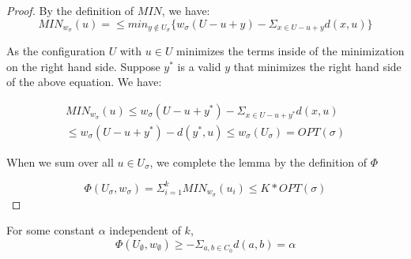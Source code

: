 \begin{proof}
     By the definition of $MIN$, we have:
     \begin{equation*}
        MIN_{w_\sigma}(u) = \leq min_{y \not \in U_\sigma} \{ w_\sigma(U - u + y) - \Sigma_{x \in U - u + y} d(x, u)\}
     \end{equation*}

     As the configuration $U$ with $u \in U$ minimizes the terms inside of the minimization on the right hand side. Suppose $y^*$ is a valid $y$ that minimizes the right hand side of the above equation. We have:
     
     \begin{equation*}
        \begin{gathered}
            MIN_{w_\sigma}(u) \leq w_\sigma(U - u + y^*) - \Sigma_{x \in U - u + y^*} d(x, u) \\
        \leq w_\sigma(U - u + y^*) - d(y^*, u) \leq w_\sigma(U_\sigma) = OPT(\sigma)
        \end{gathered}
     \end{equation*}

     When we sum over all $u \in U_\sigma$, we complete the lemma by the definition of $\Phi$
     
     \begin{equation*}
        \Phi(U_\sigma, w_\sigma) = \Sigma_{i=1}^k MIN_{w_\sigma}(u_i) \leq K * OPT(\sigma)
     \end{equation*}
\end{proof}

\begin{lemma}
    \label{lem:er2}
    For some constant $\alpha$ independent of $k$,
    \begin{equation*}
        \Phi(U_\emptyset, w_\emptyset) \geq - \Sigma_{a, b \in C_0} d(a, b) = \alpha
    \end{equation*}
\end{lemma}

